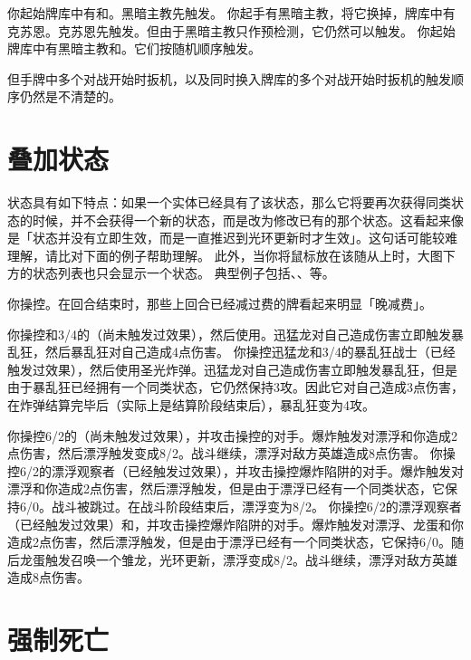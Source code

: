 \example 你起始牌库中有和。黑暗主教先触发。
\example 你起手有黑暗主教，将它换掉，牌库中有克苏恩。克苏恩先触发。但由于黑暗主教只作预检测，它仍然可以触发。
\example 你起始牌库中有黑暗主教和。它们按随机顺序触发。

但手牌中多个对战开始时扳机，以及同时换入牌库的多个对战开始时扳机的触发顺序仍然是不清楚的。

\section{叠加状态}

 状态具有如下特点：如果一个实体已经具有了该状态，那么它将要再次获得同类状态的时候，并不会获得一个新的状态，而是改为修改已有的那个状态。这看起来像是「状态并没有立即生效，而是一直推迟到光环更新时才生效」。这句话可能较难理解，请比对下面的例子帮助理解。
此外，当你将鼠标放在该随从上时，大图下方的状态列表也只会显示一个状态。
\example 典型例子包括、、等。

\example 你操控。在回合结束时，那些上回合已经减过费的牌看起来明显「晚减费」。

\example 你操控和3/4的（尚未触发过效果），然后使用。迅猛龙对自己造成伤害立即触发暴乱狂，然后暴乱狂对自己造成4点伤害。
\example 你操控迅猛龙和3/4的暴乱狂战士（已经触发过效果），然后使用圣光炸弹。迅猛龙对自己造成伤害立即触发暴乱狂，但是由于暴乱狂已经拥有一个同类状态，它仍然保持3攻。因此它对自己造成3点伤害，在炸弹结算完毕后（实际上是结算阶段结束后），暴乱狂变为4攻。

\example 你操控6/2的（尚未触发过效果），并攻击操控的对手。爆炸触发对漂浮和你造成2点伤害，然后漂浮触发变成8/2。战斗继续，漂浮对敌方英雄造成8点伤害。
\example 你操控6/2的漂浮观察者（已经触发过效果），并攻击操控爆炸陷阱的对手。爆炸触发对漂浮和你造成2点伤害，然后漂浮触发，但是由于漂浮已经有一个同类状态，它保持6/0。战斗被跳过。在战斗阶段结束后，漂浮变为8/2。
\example 你操控6/2的漂浮观察者（已经触发过效果）和，并攻击操控爆炸陷阱的对手。爆炸触发对漂浮、龙蛋和你造成2点伤害，然后漂浮触发，但是由于漂浮已经有一个同类状态，它保持6/0。随后龙蛋触发召唤一个雏龙，光环更新，漂浮变成8/2。战斗继续，漂浮对敌方英雄造成8点伤害。

\section{强制死亡}

